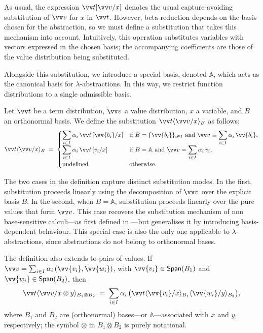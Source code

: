 \documentclass[runningheads,orivec,envcountsame,envcountsect]{llncs}
\newcommand\Span[1]{\ensuremath{{\mathsf{Span}}{#1}}}
\newcommand\ansubst[2]{\ensuremath{\langle #1 \rangle_{#2}}}
\newcommand\AbsBasis{\ensuremath{\mathbb{A}}}
\def\Pair#1#2{(#1,#2)} %
\def\ds{\displaystyle}
\begin{document}
As usual, the expression $\vv t[\vv v/x]$ denotes the
usual capture-avoiding substitution of $\vv v$ for $x$ in $\vv t$.
However, beta-reduction depends on the basis chosen for the abstraction, so we must
define a substitution that takes this mechanism into account. Intuitively, this
operation substitutes variables with vectors expressed in the chosen basis; the
accompanying coefficients are those of the value distribution being
substituted.

Alongside this substitution, we introduce a special basis, denoted
$\AbsBasis$, which acts as the canonical basis for $\lambda$-abstractions. In
this way, we restrict function distributions to a single admissible basis.


\begin{definition}
  Let $\vv t$ be a term distribution, $\vv v$ a value distribution, $x$ a
  variable, and $B$ an orthonormal basis. We define the substitution
  $\vv t\ansubst{\vv v/x}{B}$ as follows:
  \[
    \vv t\ansubst{\vv v/x}{B} \;=\;
    \begin{cases}
      \ds\sum_{i\in I}\alpha_i\,\vv t\,[\vv{b_i}/x] &
        \text{if } B=\{\vv{b_i}\}_{i\in I}\ \text{and}\
        \vv v \equiv \ds\sum_{i\in I}\alpha_i\,\vv{b_i},\\[6pt]
      \ds\sum_{i\in I}\alpha_i\,\vv t\,[v_i/x] &
        \text{if } B=\AbsBasis\ \text{and}\
        \vv v = \ds\sum_{i\in I}\alpha_i\,v_i,\\[2pt]
      \text{undefined} & \text{otherwise.}
    \end{cases}
  \]
\end{definition}

The two cases in the definition capture distinct substitution modes.  
In the first, substitution proceeds linearly using the decomposition of
$\vv v$ over the explicit basis $B$.  
In the second, when $B=\AbsBasis$, substitution proceeds linearly over the pure
values that form $\vv v$.  
This case recovers the substitution mechanism of 
non base-sensitive calculi---as first defined in
\cite{ArrighiDowekLMCS17}---but generalises it by introducing
basis-dependent behaviour.  
This special case is also the only one applicable to
$\lambda$-abstractions, since abstractions do not belong to orthonormal bases.

  The definition also extends to pairs of values. If
  $\vv v=\sum_{i\in I}\alpha_i\,\Pair{\vv{v_i}}{\vv{w_i}}$,
  with $\vv{v_i}\in\Span(B_1)$ and $\vv{w_i}\in\Span(B_2)$,
  then
  \[
    \vv t\ansubst{\vv v/x\otimes y}{B_1\otimes B_2}
      \;=\; \sum_{i\in I}\alpha_i\,
      \bigl(\vv t\ansubst{\vv{v_i}/x}{B_1}\ansubst{\vv{w_i}/y}{B_2}\bigr),
  \]
  where $B_1$ and $B_2$ are (orthonormal) bases---or $\AbsBasis$---associated
  with $x$ and $y$, respectively; the symbol $\otimes$ in $B_1\otimes B_2$ is
  purely notational.
\end{document}
